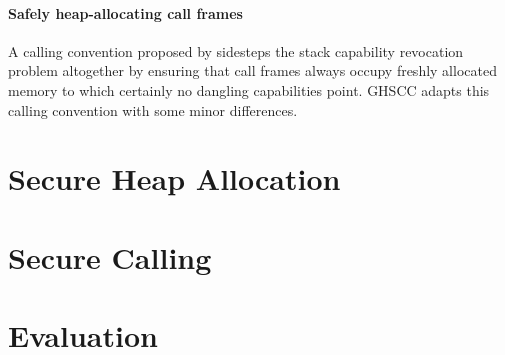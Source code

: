 \documentclass[main.tex]{subfiles}
\begin{document}
\paragraph{Safely heap-allocating call frames} A calling convention proposed by \cite{cerise} sidesteps the stack capability revocation problem altogether by ensuring that call frames always occupy freshly allocated memory to which certainly no dangling capabilities point. GHSCC adapts this calling convention with some minor differences.

\section{Secure Heap Allocation}

\section{Secure Calling}

\section{Evaluation}

\biblio{}
\onlyinsubfile{\glsaddall\printglossaries}
\end{document}
